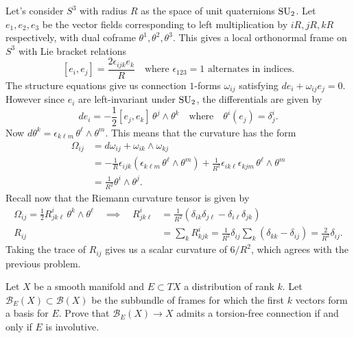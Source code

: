 \documentclass{../../templates/lkx_pset}
\begin{document}
\begin{parts}
  Let's consider $S^3$ with radius $R$ as the space of unit quaternions $\operatorname{SU}_2$. Let $e_1,e_2,e_3$ be the vector fields corresponding to left multiplication by $iR,jR,kR$ respectively, with dual coframe $\theta^1,\theta^2,\theta^3$. This gives a local orthonormal frame on $S^3$ with Lie bracket relations
  \[
    [e_i, e_j] = \frac{2\epsilon_{ijk} e_k}{R}\quad\textrm{where }\epsilon_{123}=1\textrm{ alternates in indices.}
  \]
  The structure equations give us connection $1$-forms $\omega_{ij}$ satisfying $de_i + \omega_{ij}e_j=0$. However since $e_i$ are left-invariant under $\operatorname{SU}_2$, the differentials are given by
  \[
    de_i = -\frac{1}{2}[e_j, e_k]\,\theta^j\wedge \theta^k\quad\textrm{where}\quad \theta^i(e_j)=\delta^i_j.
  \]
  Now $d\theta^k = \epsilon_{k\ell m}\, \theta^\ell\wedge \theta^m$. This means that the curvature has the form
  \[
    \begin{aligned}
      \Omega_{ij} 
      &= d\omega_{ij} + \omega_{ik}\wedge \omega_{kj}\\
      &= -\frac{1}{R}\epsilon_{i j k}\left(\epsilon_{k\ell m}\,\theta^\ell\wedge \theta^m \right) + \frac{1}{R^2}\epsilon_{ik\ell}\epsilon_{kjm}\,\theta^\ell\wedge \theta^m\\
      &= \frac{1}{R^2}\theta^i\wedge \theta^j.
    \end{aligned}
  \]
  Recall now that the Riemann curvature tensor is given by
  \[
    \begin{aligned}
    \Omega_{ij} = \frac{1}{2}R^i_{j k \ell}\,\theta^k\wedge \theta^\ell\quad\implies\quad 
    R^i_{j k \ell} &= \frac{1}{R^2}\left(\delta_{ik}\delta_{j\ell} - \delta_{i\ell}\delta_{j k}\right)\\
    R_{ij}&=\sum_k R^{i}_{k j k} = \frac{1}{R^2}\delta_{ij}\sum_k(\delta_{kk}-\delta_{ij})  = \frac{2}{R^2}\delta_{ij}.
    \end{aligned}
  \]
  Taking the trace of $R_{ij}$ gives us a scalar curvature of $6/R^2$, which agrees with the previous problem.
\end{parts}

\begin{problem}{9}
  Let $X$ be a smooth manifold and $E\subset TX$ a distribution of rank $k$. Let $\mathscr{B}_E(X)\subset \mathscr{B}(X)$ be the subbundle of frames for which the first $k$ vectors form a basis for $E$. Prove that $\mathscr{B}_E(X) \to X$ admits a torsion-free connection if and only if $E$ is involutive.
\end{problem}
\end{document}
